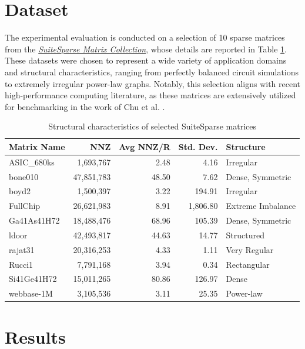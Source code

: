 \documentclass[conference]{IEEEtran}
\begin{document}
\section{Dataset}
The experimental evaluation is conducted on a selection of 10 sparse matrices from the \textit{\href{https://sparse.tamu.edu/}{SuiteSparse Matrix Collection}}, whose details are reported in Table \ref{tab:datasets}.
These datasets were chosen to represent a wide variety of application domains and structural characteristics, ranging from perfectly balanced circuit simulations to extremely irregular power-law graphs. Notably, this selection aligns with recent high-performance computing literature, as these matrices are extensively utilized for benchmarking in the work of Chu et al. \cite{bChu2023}.

\begin{table}[htbp]
\caption{Structural characteristics of selected SuiteSparse matrices}
\label{tab:datasets}
\begin{center}
\footnotesize
\setlength{\tabcolsep}{4pt}
\begin{tabular}{|l|r|r|r|l|}
\hline
\textbf{Matrix Name} & \textbf{NNZ} & \textbf{Avg NNZ/R} & \textbf{Std. Dev.} & \textbf{Structure} \\ \hline
ASIC\_680ks     & 1,693,767  & 2.48  & 4.16    & Irregular \\ \hline
bone010         & 47,851,783 & 48.50 & 7.62    & Dense, Symmetric \\ \hline
boyd2           & 1,500,397  & 3.22  & 194.91  & Irregular \\ \hline
FullChip        & 26,621,983 & 8.91  & 1,806.80& Extreme Imbalance \\ \hline
Ga41As41H72     & 18,488,476 & 68.96 & 105.39  & Dense, Symmetric \\ \hline
ldoor           & 42,493,817 & 44.63 & 14.77   & Structured \\ \hline
rajat31         & 20,316,253 & 4.33  & 1.11    & Very Regular \\ \hline
Rucci1          & 7,791,168  & 3.94  & 0.34    & Rectangular \\ \hline
Si41Ge41H72     & 15,011,265 & 80.86 & 126.97  & Dense \\ \hline
webbase-1M      & 3,105,536  & 3.11  & 25.35   & Power-law \\ \hline
\end{tabular}
\end{center}
\end{table}
\section{Results}
\end{document}
